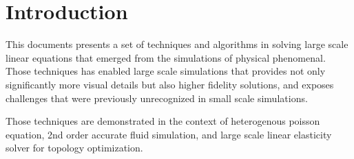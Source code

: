 \chapter{Introduction}
This documents presents a set of techniques and algorithms in solving large scale linear equations that emerged from the simulations of physical phenomenal. Those techniques has enabled large scale simulations that provides not only significantly more visual details but also higher fidelity solutions, and exposes challenges that were previously unrecognized in small scale simulations.

Those techniques are demonstrated in the context of heterogenous poisson equation, 2nd order accurate fluid simulation, and large scale linear elasticity solver for topology optimization. 